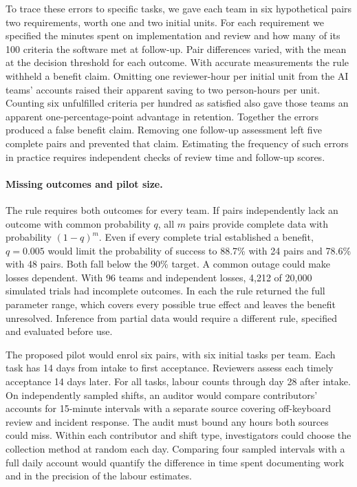 To trace these errors to specific tasks, we gave each team in six hypothetical pairs two requirements, worth one and two initial units. For each requirement we specified the minutes spent on implementation and review and how many of its 100 criteria the software met at follow-up. Pair differences varied, with the mean at the decision threshold for each outcome. With accurate measurements the rule withheld a benefit claim. Omitting one reviewer-hour per initial unit from the AI teams' accounts raised their apparent saving to two person-hours per unit. Counting six unfulfilled criteria per hundred as satisfied also gave those teams an apparent one-percentage-point advantage in retention. Together the errors produced a false benefit claim. Removing one follow-up assessment left five complete pairs and prevented that claim. Estimating the frequency of such errors in practice requires independent checks of review time and follow-up scores.

\paragraph{Missing outcomes and pilot size.} The rule requires both outcomes for every team. If pairs independently lack an outcome with common probability $q$, all $m$ pairs provide complete data with probability $(1-q)^m$. Even if every complete trial established a benefit, $q=0.005$ would limit the probability of success to 88.7\% with 24 pairs and 78.6\% with 48 pairs. Both fall below the 90\% target. A common outage could make losses dependent. With 96 teams and independent losses, 4,212 of 20,000 simulated trials had incomplete outcomes. In each the rule returned the full parameter range, which covers every possible true effect and leaves the benefit unresolved. Inference from partial data would require a different rule, specified and evaluated before use.

The proposed pilot would enrol six pairs, with six initial tasks per team. Each task has 14 days from intake to first acceptance. Reviewers assess each timely acceptance 14 days later. For all tasks, labour counts through day 28 after intake. On independently sampled shifts, an auditor would compare contributors' accounts for 15-minute intervals with a separate source covering off-keyboard review and incident response. The audit must bound any hours both sources could miss. Within each contributor and shift type, investigators could choose the collection method at random each day. Comparing four sampled intervals with a full daily account would quantify the difference in time spent documenting work and in the precision of the labour estimates.

